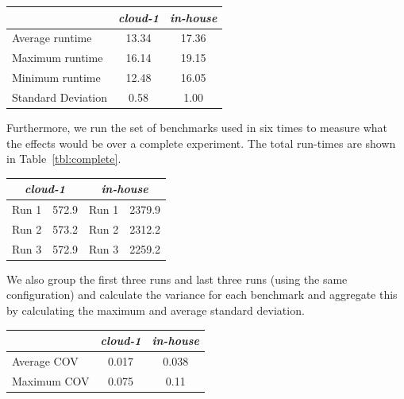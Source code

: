 \documentclass[a4paper]{IEEEtran}
\begin{document}
\begin{Figure}
  \centering
  \begin{tabular}{|l|c|c|}
    \hline
    & \emph{cloud-1} & \emph{in-house} \\
  \hline
  Average runtime &  13.34 & 17.36\\
  \hline
  Maximum runtime & 16.14 & 19.15 \\
  \hline
  Minimum runtime & 12.48 & 16.05\\
  \hline      
  Standard Deviation & 0.58 & 1.00 \\
  \hline
\end{tabular}
\label{tbl:one}
\end{Figure}

Furthermore, we run the set of benchmarks used in \cite{uppsat} six times to measure what the effects would be over a complete experiment. The total run-times are shown in Table~\ref{tbl:complete}.

\begin{Figure}
  \centering
\begin{tabular}{|l|c|l|c|}
  \hline
  \multicolumn{2}{|c|}{\emph{cloud-1}} & \multicolumn{2}{c|}{\emph{in-house}} \\
  \hline
  Run 1 &  572.9 & Run 1 & 2379.9 \\
  \hline
  Run 2 & 573.2 & Run 2 & 2312.2 \\
  \hline
  Run 3 & 572.9 & Run 3 & 2259.2 \\
  \hline      
\end{tabular}
\label{tbl:complete}
\end{Figure}

We also group the first three runs and last three runs (using the same configuration) and calculate the variance for each benchmark and aggregate this by calculating the maximum and average standard deviation.

\begin{Figure}
  \centering
  \begin{tabular}{|l|c|c|}
    \hline
    & \emph{cloud-1} & \emph{in-house} \\
  \hline
  Average COV & 0.017 & 0.038 \\
  \hline
  Maximum COV  & 0.075 & 0.11 \\
  \hline
\end{tabular}
\label{tbl:one}
\end{Figure}
\end{document}
